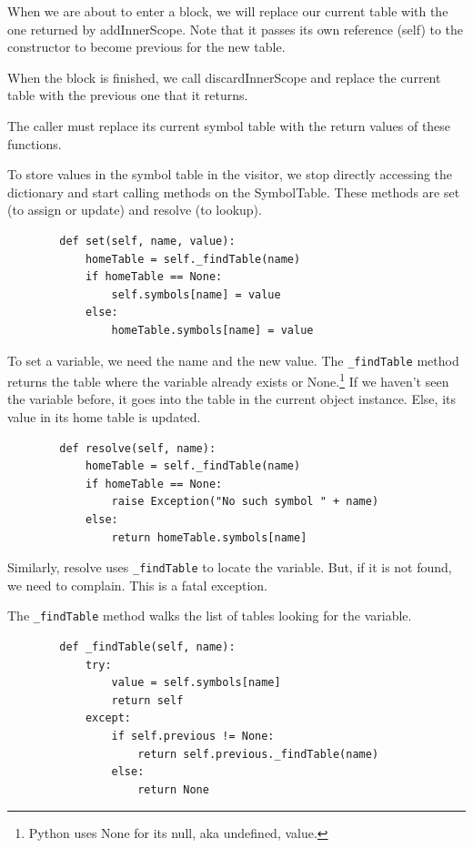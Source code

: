When we are about to enter a block, we will replace our current table
with the one returned by addInnerScope. Note that it passes its own
reference (self) to the constructor to become previous for the new table.

When the block is finished, we call discardInnerScope and replace the
current table with the previous one that it returns.

The caller must replace its current symbol table with the return values
of these functions.

To store values in the symbol table in the visitor, we stop directly
accessing the dictionary and start calling methods on the SymbolTable.
These methods are set (to assign or update) and resolve (to lookup).

{\footnotesize
\begin{verbatim}
        def set(self, name, value):
            homeTable = self._findTable(name)
            if homeTable == None:
                self.symbols[name] = value
            else:
                homeTable.symbols[name] = value
\end{verbatim}
}

To set a variable, we need the name and the new value. The
\verb+_findTable+ method
returns the table where the variable already exists or
None.\footnote{Python uses None for its null, aka undefined, value.}
If we haven't seen the variable before, it goes into the
table in the current object instance. Else, its value in its home table
is updated.

{\footnotesize
\begin{verbatim}
        def resolve(self, name):
            homeTable = self._findTable(name)
            if homeTable == None:
                raise Exception("No such symbol " + name)
            else:
                return homeTable.symbols[name]
\end{verbatim}
}

Similarly, resolve uses \verb+_findTable+ to locate the variable. But, if
it is not found, we need to complain. This is a fatal exception.

The \verb+_findTable+ method walks the list of tables looking for the variable.

{\footnotesize
\begin{verbatim}
        def _findTable(self, name):
            try:
                value = self.symbols[name]
                return self
            except:
                if self.previous != None:
                    return self.previous._findTable(name)
                else:
                    return None
\end{verbatim}
}

